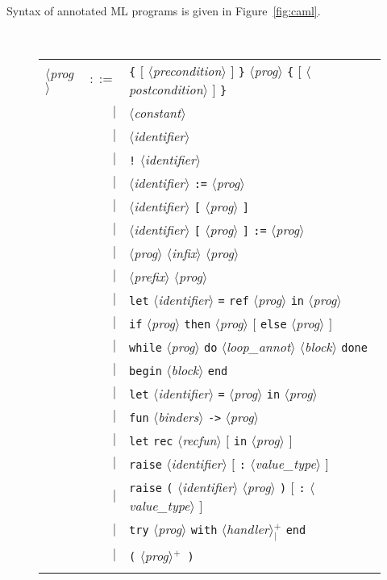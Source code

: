 \documentclass[a4paper,12pt]{report}
\makeatletter
\newcommand{\te}[1]{\texttt{#1}}
\newcommand{\nt}[1]{$\langle$\textsl{#1}$\rangle$}
\newcommand{\indexnt}[1]{\index{#1@\textsl{#1}, grammar entry}}
\newcommand{\plus}{$^+$}
\newcommand{\plussep}[1]{$^+_#1$}
\makeatother
\begin{document}
Syntax of annotated ML programs is given in Figure~\ref{fig:caml}.
\begin{figure}[htbp]
\begin{center}
\hrulefill\\
\begin{tabular}{lrl}
  \nt{prog}\indexnt{prog}
    & $::=$ & \te{\{} $[$ \nt{precondition} $]$ \te{\}}
              \nt{prog} 
              \te{\{} $[$ \nt{postcondition} $]$ \te{\}} \\
      & $|$ & \nt{constant} \\
      & $|$ & \nt{identifier} \\
      & $|$ & \te{!} \nt{identifier} \\
      & $|$ & \nt{identifier} \te{:=} \nt{prog} \\
      & $|$ & \nt{identifier} \te{[} \nt{prog} \te{]} \\
      & $|$ & \nt{identifier} \te{[} \nt{prog} \te{]} \te{:=} \nt{prog} \\
      & $|$ & \nt{prog} \nt{infix} \nt{prog} \\
      & $|$ & \nt{prefix} \nt{prog} \\
      & $|$ & \te{let} \nt{identifier} \te{=} \te{ref} 
              \nt{prog} \te{in} \nt{prog} \\
      & $|$ & \te{if} \nt{prog} \te{then} \nt{prog}
              $[$ \te{else} \nt{prog} $]$ \\
      & $|$ & \te{while} \nt{prog} \te{do}
              \nt{loop\_annot} \nt{block} \te{done} \\
      & $|$ & \te{begin} \nt{block} \te{end} \\
      & $|$ & \te{let} \nt{identifier} \te{=} \nt{prog} 
              \te{in} \nt{prog} \\
      & $|$ & \te{fun} \nt{binders} \te{->} \nt{prog} \\
      & $|$ & \te{let} \te{rec} \nt{recfun} $[$ \te{in} \nt{prog} $]$ \\
      & $|$ & \te{raise} \nt{identifier} $[$ \te{:} \nt{value\_type} $]$ \\
      & $|$ & \te{raise} \te{(} \nt{identifier} \nt{prog} \te{)}
              $[$ \te{:} \nt{value\_type} $]$ \\
      & $|$ & \te{try} \nt{prog} \te{with} 
              \nt{handler}\plussep{\te{|}} \te{end} \\
      & $|$ & \te{(} \nt{prog}\plus\  \te{)} \\
  \\[0.1em]


\end{tabular}
\end{center}
\end{figure}
\end{document}

